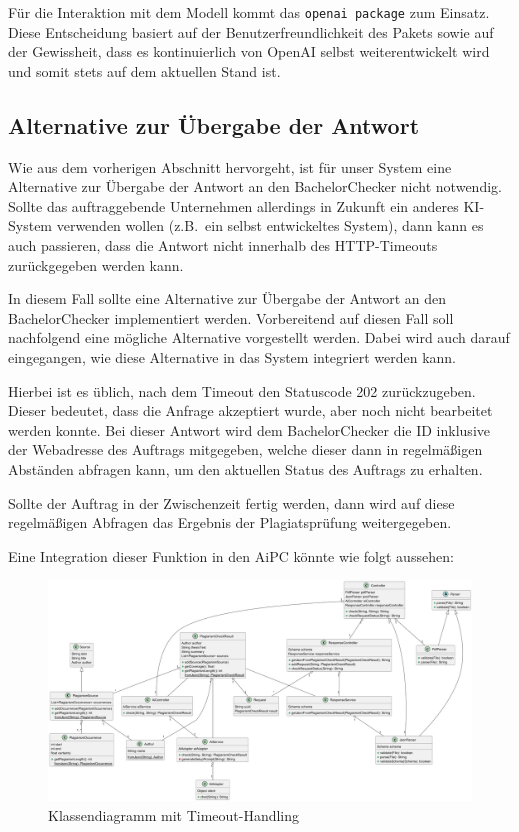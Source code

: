 Für die Interaktion mit dem Modell kommt das \texttt{openai package} zum Einsatz.
Diese Entscheidung basiert auf der Benutzerfreundlichkeit des Pakets sowie auf der Gewissheit,
dass es kontinuierlich von OpenAI selbst weiterentwickelt wird und somit stets auf dem aktuellen Stand ist.


\subsection{Alternative zur Übergabe der Antwort}\label{subsec:alternative-zur-uebergabe-der-antwort}
Wie aus dem vorherigen Abschnitt hervorgeht, ist für unser System eine Alternative zur Übergabe der Antwort
an den BachelorChecker nicht notwendig.
Sollte das auftraggebende Unternehmen allerdings in Zukunft ein anderes KI-System verwenden wollen (z.B.\ ein selbst entwickeltes System),
dann kann es auch passieren, dass die Antwort nicht innerhalb des HTTP-Timeouts zurückgegeben werden kann.

In diesem Fall sollte eine Alternative zur Übergabe der Antwort an den BachelorChecker implementiert werden.
Vorbereitend auf diesen Fall soll nachfolgend eine mögliche Alternative vorgestellt werden.
Dabei wird auch darauf eingegangen, wie diese Alternative in das System integriert werden kann.

Hierbei ist es üblich, nach dem Timeout den Statuscode 202 zurückzugeben.
Dieser bedeutet, dass die Anfrage akzeptiert wurde, aber noch nicht bearbeitet werden konnte\autocite{mozilla}.
Bei dieser Antwort wird dem BachelorChecker die ID inklusive der Webadresse des Auftrags mitgegeben,
welche dieser dann in regelmäßigen Abständen abfragen kann, um den aktuellen Status des Auftrags zu erhalten.

Sollte der Auftrag in der Zwischenzeit fertig werden, dann wird auf diese regelmäßigen Abfragen das Ergebnis
der Plagiatsprüfung weitergegeben.

Eine Integration dieser Funktion in den \ac{AiPC} könnte wie folgt aussehen:
\begin{figure}[H]
    \centering
    \includegraphics[width=\textwidth]{images/diagrams/Klassendiagramm_HTTP_202}
    \caption{Klassendiagramm mit Timeout-Handling}
    \label{fig:klassendiagramm-mit-timeout-handling}
\end{figure}

